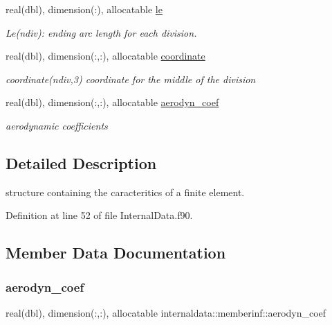 \begin{DoxyCompactItemize}
real(dbl), dimension(\+:), allocatable \hyperlink{structinternaldata_1_1memberinf_a4328603e20b1c327a37c30020048d96f}{le}
\begin{DoxyCompactList}\small\item\em Le(ndiv)\+: ending arc length for each division. \end{DoxyCompactList}\item 
real(dbl), dimension(\+:,\+:), allocatable \hyperlink{structinternaldata_1_1memberinf_aa467d076d70681ba6154b70aba9d957e}{coordinate}
\begin{DoxyCompactList}\small\item\em coordinate(ndiv,3) coordinate for the middle of the division \end{DoxyCompactList}\item 
real(dbl), dimension(\+:,\+:), allocatable \hyperlink{structinternaldata_1_1memberinf_aecd779a520e16b62e3d093885db7c5c4}{aerodyn\+\_\+coef}
\begin{DoxyCompactList}\small\item\em aerodynamic coefficients \end{DoxyCompactList}\end{DoxyCompactItemize}


\subsection{Detailed Description}
structure containing the caracteritics of a finite element. 

Definition at line 52 of file Internal\+Data.\+f90.



\subsection{Member Data Documentation}
\mbox{\label{structinternaldata_1_1memberinf_aecd779a520e16b62e3d093885db7c5c4}} 
\subsubsection{\texorpdfstring{aerodyn\+\_\+coef}{aerodyn\_coef}}
{\footnotesize\ttfamily real(dbl), dimension(\+:,\+:), allocatable internaldata\+::memberinf\+::aerodyn\+\_\+coef}




